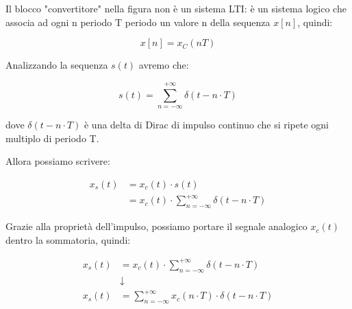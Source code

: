 \begin{tcolorbox}
Il blocco "convertitore" nella figura non è un sistema LTI: 
è un sistema logico che associa ad ogni n periodo T periodo un valore n della sequenza $x \left[ n\right]$, quindi: 

{
    \Large 
    \begin{equation}
        x \left[ n\right] = x_C \left(n T\right)
    \end{equation}
}
\end{tcolorbox}

Analizzando la sequenza $s \left(t\right)$ avremo che: 

{
    \Large 
    \begin{equation}
        s \left( t\right) 
        = 
        \sum_{n = - \infty}^{+ \infty} 
        \delta \left(t - n \cdot T\right)
    \end{equation}
} 

dove $\delta \left(t - n \cdot T\right)$ è una delta di Dirac di impulso continuo che si ripete ogni multiplo di periodo T. \newline 

Allora possiamo scrivere: 

{
    \Large 
    \begin{equation}
        \begin{split}
            x_s \left(t\right) 
            &= 
            x_c \left(t\right)  \cdot s \left(t\right) 
            \\
            &=  
            x_c \left(t\right)  
            \cdot 
            \sum_{n = - \infty}^{+ \infty} 
            \delta \left(t - n \cdot T\right) 
        \end{split}
    \end{equation}
}

\newpage 

Grazie alla proprietà dell'impulso, 
possiamo portare il segnale analogico $x_c \left(t\right)$ dentro la sommatoria, quindi: 

{
    \Large 
    \begin{equation}
        \begin{split}
            x_s \left(t\right) 
            &= 
            x_c \left(t\right)  
            \cdot 
            \sum_{n = - \infty}^{+ \infty} 
            \delta \left(t - n \cdot T\right)  
            \\
            &\downarrow
            \\
            x_s \left(t\right) 
            &= 
            \sum_{n = - \infty}^{+ \infty} 
            x_c \left(n \cdot T\right)  
            \cdot 
            \delta \left(t - n \cdot T\right)  
        \end{split}
    \end{equation}
}

